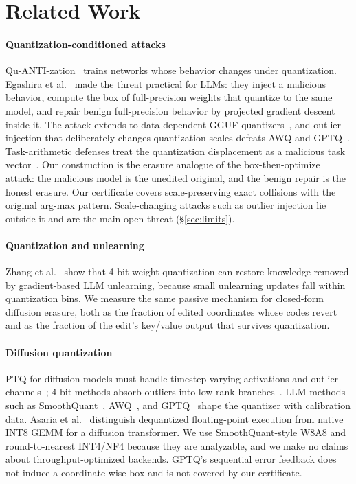 \section{Related Work}
\label{sec:related}
\paragraph{Quantization-conditioned attacks}
Qu-ANTI-zation~\cite{hong2021} trains networks whose behavior changes under
quantization. Egashira et al.~\cite{egashira2024} made the threat practical for LLMs:
they inject a malicious behavior, compute the box of full-precision weights that
quantize to the same model, and repair benign full-precision behavior by projected
gradient descent inside it. The attack extends to data-dependent GGUF
quantizers~\cite{egashira2025}, and outlier injection that deliberately changes
quantization scales defeats AWQ and GPTQ~\cite{zhan2026}. Task-arithmetic
defenses treat the quantization displacement as a malicious task
vector~\cite{yang2026qvec}. Our construction is the erasure analogue of the
box-then-optimize attack: the malicious model is the unedited original, and the benign
repair is the honest erasure. Our certificate covers scale-preserving exact collisions
with the original arg-max pattern. Scale-changing attacks such as outlier injection lie outside it and are
the main open threat (\S\ref{sec:limits}).

\paragraph{Quantization and unlearning}
Zhang et al.~\cite{zhang2025} show that 4-bit weight quantization can restore
knowledge removed by gradient-based LLM unlearning, because small unlearning updates
fall within quantization bins. We measure the same passive mechanism for closed-form
diffusion erasure, both as the fraction of edited coordinates whose codes revert and as
the fraction of the edit's key/value output that survives quantization.

\paragraph{Diffusion quantization}
PTQ for diffusion models must handle timestep-varying activations and outlier
channels~\cite{ptq4dm,qdiffusion}; 4-bit methods absorb outliers into low-rank
branches~\cite{svdquant}. LLM methods such as SmoothQuant~\cite{smoothquant},
AWQ~\cite{awq}, and GPTQ~\cite{gptq} shape the quantizer with calibration data.
Asaria et al.~\cite{asaria2026} distinguish dequantized floating-point execution
from native INT8 GEMM for a diffusion transformer. We use SmoothQuant-style W8A8 and
round-to-nearest INT4/NF4 because they are analyzable, and we make no claims about throughput-optimized
backends. GPTQ's sequential error feedback does not induce a coordinate-wise box and
is not covered by our certificate.

